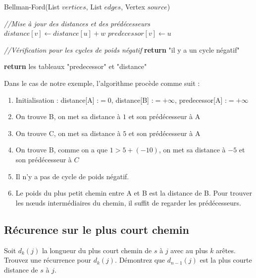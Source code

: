 \begin{solution}
\begin{algorithm}{Bellman-Ford(List $vertices$, List $edges$, Vertex $source$)}
\begin{algorithmic}
				\medskip
				\STATE \textit{//Mise à jour des distances et des prédécesseurs}
							\STATE $distance[v] \leftarrow distance[u] + w$
							\STATE $predecessor[v] \leftarrow u$
						\ENDIF
					\ENDFOR
				\ENDFOR

				\medskip
				\STATE \textit{//Vérification pour les cycles de poids négatif}
						\STATE \textbf{return} "il y a un cycle négatif"
					\ENDIF
				\ENDFOR
				\medskip

				\STATE \textbf{return} les tableaux "predecessor" et "distance"
			\end{algorithmic}
		\end{algorithm}

		Dans le cas de notre exemple, l'algorithme procède comme suit :
		\begin{enumerate}
			\item Initialisation : distance[A] :$= 0$, distance[B] :$= +\infty$, predecessor[A] :$= +\infty$
			\item On trouve B, on met sa distance à $1$ et son prédécesseur à A
			\item On trouve C, on met sa distance à $5$ et son prédécesseur à A
			\item On trouve B, comme on a que $1>5+(-10)$, on met sa distance à $-5$ et son prédécesseur à $C$
			\item Il n'y a pas de cycle de poids négatif.
			\item Le poids du plus petit chemin entre A et B est la distance de B. Pour trouver les nœuds intermédiaires du chemin, il suffit de regarder les prédécesseurs.
		\end{enumerate}
\end{solution}

\subsection{Récurence sur le plus court chemin} Soit $d_k(j)$ la longueur du plus court chemin de $s$ à $j$ avec au plus $k$ arêtes. Trouvez une récurrence pour $d_k(j)$. Démontrez que $d_{n-1}(j)$ est la plus courte distance de $s$ à $j$.


